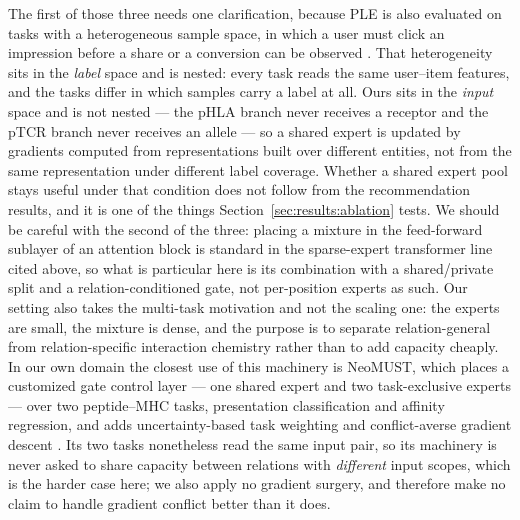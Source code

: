 \documentclass[webpdf,modern,large,namedate]{oup-authoring-template}
\theoremstyle{thmstyleone}
\theoremstyle{thmstyletwo}
\theoremstyle{thmstylethree}
\newcommand{\PH}{pHLA}
\newcommand{\PT}{pTCR}
\begin{document}
The first of those three needs one clarification, because PLE is also evaluated
on tasks with a heterogeneous sample space, in which a user must click an
impression before a share or a conversion can be observed
\citep{tang2020ple}. That heterogeneity sits in the \emph{label} space and is
nested: every task reads the same user--item features, and the tasks differ in
which samples carry a label at all. Ours sits in the \emph{input} space and is
not nested --- the \PH{} branch never receives a receptor and the \PT{} branch
never receives an allele --- so a shared expert is updated by gradients
computed from representations built over different entities, not from the same
representation under different label coverage. Whether a shared expert pool
stays useful under that condition does not follow from the recommendation
results, and it is one of the things Section~\ref{sec:results:ablation} tests.
We should be careful with the second of the three: placing a mixture in the feed-forward sublayer of an
attention block is standard in the sparse-expert transformer line cited above,
so what is particular here is its combination with a shared/private split and
a relation-conditioned gate, not per-position experts as such. Our setting also
takes the multi-task motivation and not the scaling one: the experts are small,
the mixture is dense, and the purpose is to separate relation-general from
relation-specific interaction chemistry rather than to add capacity cheaply.
In our own domain the closest
use of this machinery is NeoMUST, which places a customized gate control layer
--- one shared expert and two task-exclusive experts --- over two peptide--MHC
tasks, presentation classification and affinity regression, and adds
uncertainty-based task weighting and conflict-averse gradient descent
\citep{ma2024neomust}. Its two tasks nonetheless read the same input pair, so
its machinery is never asked to share capacity between relations with
\emph{different} input scopes, which is the harder case here; we also apply no
gradient surgery, and therefore make no claim to handle gradient conflict
better than it does.
\end{document}
